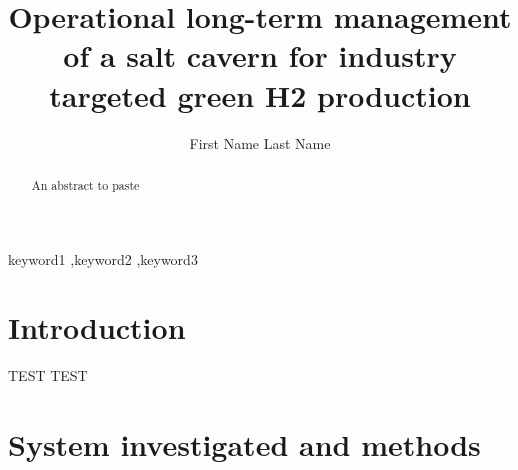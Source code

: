 \documentclass[authoryear,preprint,12pt]{elsarticle}
\begin{document}
\title{Operational long-term management of a salt cavern for industry targeted green H2 production}

\author{First Name Last Name}

\address{Paris-Saclay University}

\begin{abstract}
    An abstract to paste
\end{abstract}

\begin{keyword}
keyword1 \sep keyword2 \sep keyword3
\end{keyword}

\maketitle

\clearpage
\section{Introduction}
\label{Intro}

TEST TEST




\section{System investigated and methods}


\clearpage
\appendix







\end{document}
